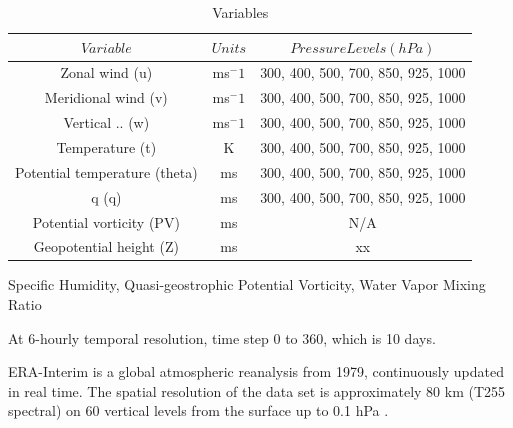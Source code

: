 \begin{table}[h]
	\caption{Variables}\label{t_variables}
	\begin{center}
		\begin{tabular}{ccc}
			
			\hline\hline
			$Variable$ & $Units$ & $Pressure Levels (hPa)$ \\
			\hline
			Zonal wind (u) & ms$^-1$ & 300, 400, 500, 700, 850, 925, 1000 \\ %
			Meridional wind (v) & ms$^-1$ & 300, 400, 500, 700, 850, 925, 1000  \\
			Vertical .. (w) & ms$^-1$ & 300, 400, 500, 700, 850, 925, 1000  \\
			Temperature (t) & K & 300, 400, 500, 700, 850, 925, 1000 \\
			Potential temperature (theta) & ms & 300, 400, 500, 700, 850, 925, 1000  \\
			q (q) & ms & 300, 400, 500, 700, 850, 925, 1000  \\
			Potential vorticity (PV) & ms & N/A  \\
			Geopotential height (Z) & ms & xx  \\
			
			\hline
		\end{tabular}
	\end{center}
\end{table}
Specific Humidity, Quasi-geostrophic Potential Vorticity, Water Vapor Mixing Ratio

At 6-hourly temporal resolution, time step 0 to 360, which is 10 days.

ERA-Interim is a global atmospheric reanalysis from 1979, continuously updated in real time. The spatial resolution of the data set is approximately 80 km (T255 spectral) on 60 vertical levels from the surface up to 0.1 hPa \citep{dee2011era}.

